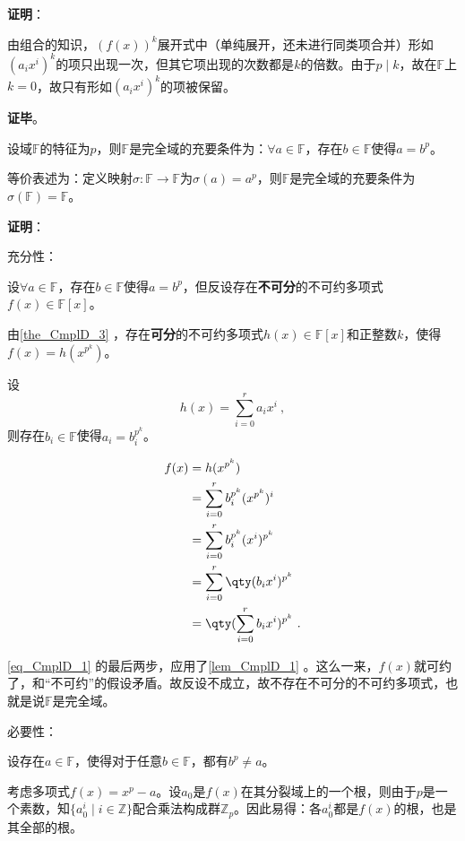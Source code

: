 \textbf{证明}：

由组合的知识，$(f(x))^k$展开式中（单纯展开，还未进行同类项合并）形如$(a_ix^i)^k$的项只出现一次，但其它项出现的次数都是$k$的倍数。由于$p\mid k$，故在$\mathbb{F}$上$k=0$，故只有形如$(a_ix^i)^k$的项被保留。

\textbf{证毕}。

\begin{theorem}{}\label{the_CmplD_4}
设域$\mathbb{F}$的特征为$p$，则$\mathbb{F}$是完全域的充要条件为：$\forall a\in\mathbb{F}$，存在$b\in\mathbb{F}$使得$a=b^p$。

等价表述为：定义映射$\sigma:\mathbb{F}\to\mathbb{F}$为$\sigma(a)=a^p$，则$\mathbb{F}$是完全域的充要条件为$\sigma(\mathbb{F})=\mathbb{F}$。
\end{theorem}

\textbf{证明}：

充分性：

设$\forall a\in\mathbb{F}$，存在$b\in\mathbb{F}$使得$a=b^p$，但反设存在\textbf{不可分}的不可约多项式$f(x)\in\mathbb{F}[x]$。

由\autoref{the_CmplD_3} ，存在\textbf{可分}的不可约多项式$h(x)\in\mathbb{F}[x]$和正整数$k$，使得$f(x)=h(x^{p^k})$。

设
\begin{equation}
h(x) = \sum_{i=0}^r a_ix^i~,
\end{equation}
则存在$b_i\in\mathbb{F}$使得$a_i=b_i^{p^k}$。

\begin{equation}\label{eq_CmplD_1}
\begin{aligned}
f(x)&=h(x^{p^k}) \\
&=\sum_{i=0}^r b_i^{p^k}(x^{p^k})^i\\
&=\sum_{i=0}^r b_i^{p^k}(x^{i})^{p^k}\\
&=\sum_{i=0}^r \qty(b_ix^i)^{p^k}\\
&=\qty(\sum_{i=0}^r b_ix^i)^{p^k}~.
\end{aligned}
\end{equation}

\autoref{eq_CmplD_1} 的最后两步，应用了\autoref{lem_CmplD_1} 。这么一来，$f(x)$就可约了，和“不可约”的假设矛盾。故反设不成立，故不存在不可分的不可约多项式，也就是说$\mathbb{F}$是完全域。

必要性：

设存在$a\in\mathbb{F}$，使得对于任意$b\in\mathbb{F}$，都有$b^p\neq a$。

考虑多项式$f(x) = x^p-a$。设$a_0$是$f(x)$在其分裂域上的一个根，则由于$p$是一个素数，知$\{a_0^i\mid i\in\mathbb{Z}\}$配合乘法构成群$\mathbb{Z}_p$。因此易得：各$a_0^i$都是$f(x)$的根，也是其全部的根。

